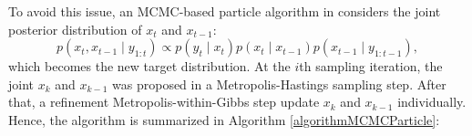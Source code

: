 To avoid this issue, an MCMC-based particle algorithm in \citep{pang2008models} considers the joint posterior distribution of $x_t$ and $x_{t-1}$:
\begin{equation}
p(x_t,x_{t-1}\mid y_{1:t})\propto p(y_t\mid x_t)p(x_t\mid x_{t-1})p(x_{t-1}\mid y_{1:t-1}),
\end{equation}
which becomes the new target distribution. At the $i$th sampling iteration, the joint $x_k$ and $x_{k-1}$ was proposed in a Metropolis-Hastings sampling step. After that, a refinement Metropolis-within-Gibbs step update $x_k$ and $x_{k-1}$ individually. Hence, the algorithm is summarized in Algorithm \ref{algorithmMCMCParticle}:
